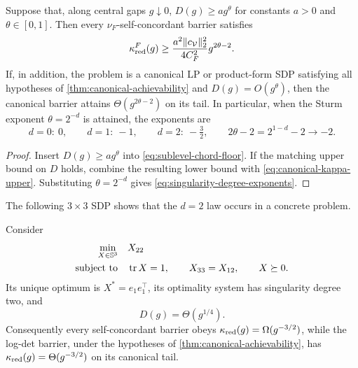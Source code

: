 \begin{corollary}
\label{cor:fractional-conditioning-laws}
Suppose that, along central gaps $g\downarrow0$,
$D(g)\geq a g^\theta$ for constants $a>0$ and $\theta\in[0,1]$.  Then every
$\nu_F$-self-concordant barrier satisfies
\begin{equation}
 \kappa_{\rm red}^{F}(g)
 \geq
 \frac{a^2\lVert c_{\mathcal V}\rVert_2^2}{4C_F^2}
 g^{2\theta-2}.
 \label{eq:holder-conditioning-law}
\end{equation}
If, in addition, the problem is a canonical LP or product-form SDP satisfying
all hypotheses of \cref{thm:canonical-achievability} and
$D(g)=O(g^\theta)$, then the canonical barrier attains
$\Theta(g^{2\theta-2})$ on its tail.  In particular, when the Sturm exponent
$\theta=2^{-d}$ is attained, the exponents are
\begin{equation}
 d=0:\ 0,\qquad d=1:\ -1,\qquad d=2:\ -\tfrac32,
 \qquad
 2\theta-2=2^{1-d}-2\longrightarrow-2.
 \label{eq:singularity-degree-exponents}
\end{equation}
\end{corollary}

\begin{proof}
Insert $D(g)\geq ag^\theta$ into
\eqref{eq:sublevel-chord-floor}.  If the matching upper bound on $D$ holds,
combine the resulting lower bound with
\eqref{eq:canonical-kappa-upper}.  Substituting $\theta=2^{-d}$ gives
\eqref{eq:singularity-degree-exponents}.
\end{proof}

The following $3\times3$ SDP shows that the $d=2$ law occurs in a concrete
problem.

\begin{proposition}
\label{prop:degree-two-witness}
Consider
\begin{equation}
 \begin{aligned}
  \min_{X\in\mathbb{S}^3}\quad &X_{22}\\
  \text{subject to}\quad &\operatorname{tr} X=1,\qquad X_{33}=X_{12},
  \qquad X\succeq0.
 \end{aligned}
 \label{eq:degree-two-sdp}
\end{equation}
Its unique optimum is $X^*=e_1e_1^\top$, its optimality system has singularity
degree two, and
\begin{equation}
 D(g)=\Theta(g^{1/4}).
 \label{eq:degree-two-diameter}
\end{equation}
Consequently every self-concordant barrier obeys
$\kappa_{\rm red}(g)=\Omega(g^{-3/2})$, while the log-det barrier, under the
hypotheses of \cref{thm:canonical-achievability}, has
$\kappa_{\rm red}(g)=\Theta(g^{-3/2})$ on its canonical tail.
\end{proposition}

